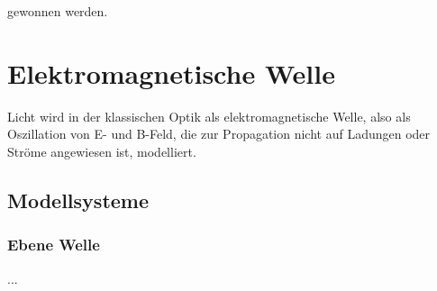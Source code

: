 \documentclass{article}
\begin{document}
gewonnen werden.


\newpage


\section{Elektromagnetische Welle}
Licht wird in der klassischen Optik als elektromagnetische Welle, also als Oszillation von E- und B-Feld, die zur Propagation nicht auf Ladungen oder Ströme angewiesen ist, modelliert.


\newpage


\subsection{Modellsysteme}
\subsubsection{Ebene Welle}
...\\
\\
\end{document}
